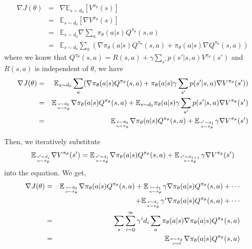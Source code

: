 \documentclass[12pt]{article}
\begin{document}
\subsection{}
\begin{eqnarray}
    \nabla J(\theta) &=& \nabla \mathbb{E}_{s \sim d_0} [V ^{\pi_{\theta}}(s)] \nonumber \\
    &=& \mathbb{E}_{s \sim d_0} [\nabla V ^{\pi_{\theta}}(s)] \nonumber \\
    &=& \mathbb{E} _{s \sim d_0} \nabla \sum_{a} \pi_{\theta}(a | s) Q^{\pi_{\theta}}(s, a) \nonumber \\
    &=& \mathbb{E} _{s \sim d_0} \sum_{a} (\nabla \pi_{\theta}(a | s) Q^{\pi_{\theta}}(s, a) + \pi_{\theta}(a | s)\nabla Q^{\pi_{\theta}}(s, a) )\nonumber
\end{eqnarray}
where we konw that $ Q^{\pi_{\theta}}(s, a) = R(s, a) + \gamma \sum_{s'} p(s' | s, a) V^{\pi_{\theta}}(s')$ and $R(s, a)$ is independent of $\theta$, we have
\begin{eqnarray}
    \nabla J(\theta) &=& \mathbb{E} _{s \sim d_0} \sum_{a} (\nabla \pi_{\theta}(a | s) Q^{\pi_{\theta}}(s, a) + \pi_{\theta}(a | s) \gamma \sum_{s'} p(s' | s, a)\nabla V^{\pi_{\theta}}(s')) \nonumber \\
    &=& \mathbb{E} _{s \sim d_0 \atop a \sim \pi_{\theta}} \nabla \pi_{\theta}(a | s) Q^{\pi_{\theta}}(s, a) + \mathbb{E} _{s \sim d_0} \pi_{\theta}(a | s) \gamma \sum_{s'} p(s' | s, a)\nabla V^{\pi_{\theta}}(s') \nonumber \\
    &=& \mathbb{E} _{s \sim d_0 \atop a \sim \pi_{\theta}} \nabla \pi_{\theta}(a | s) Q^{\pi_{\theta}}(s, a) + \mathbb{E} _{s' \sim d_1 \atop a \sim \pi_{\theta}} \gamma \nabla V^{\pi_{\theta}}(s') \nonumber
\end{eqnarray}

Then, we iteratively substitute 
\begin{equation}
    \mathbb{E} _{s' \sim d_i \atop a \sim \pi_{\theta}} \nabla V^{\pi_{\theta}}(s') = \mathbb{E} _{s' \sim d_i \atop a \sim \pi_{\theta}} \nabla \pi_{\theta}(a | s) Q^{\pi_{\theta}}(s, a) + \mathbb{E} _{s' \sim d_{1+1} \atop a \sim \pi_{\theta}} \gamma \nabla V^{\pi_{\theta}}(s')
\end{equation}
     into the equation. We get,
\begin{eqnarray}
    \nabla J(\theta) &=& \mathbb{E} _{s \sim d_0 \atop a \sim \pi_{\theta}} \nabla \pi_{\theta}(a | s) Q^{\pi_{\theta}}(s, a) + \mathbb{E} _{s \sim d_1 \atop a \sim \pi_{\theta}} \gamma \nabla \pi_{\theta}(a | s) Q^{\pi_{\theta}}(s, a) + \cdots \nonumber \\
    &&\quad \quad \quad\quad \quad \quad\quad\quad + \mathbb{E} _{s \sim d_i \atop a \sim \pi_{\theta}} \gamma^i \nabla \pi_{\theta}(a | s) Q^{\pi_{\theta}}(s, a) + \cdots \nonumber \\
    &=&\sum_{s} \sum_{i=0}^{\infty} \gamma^i d_{i}\sum_{a}\pi_{\theta}(a | s) \nabla \pi_{\theta}(a | s) Q^{\pi_{\theta}}(s, a) \nonumber \\
    &=&  \mathbb{E} _{a  \sim \pi_{\theta} \atop s \sim d} \nabla \pi_{\theta}(a | s) Q^{\pi_{\theta}}(s, a) \nonumber
\end{eqnarray}
\end{document}
